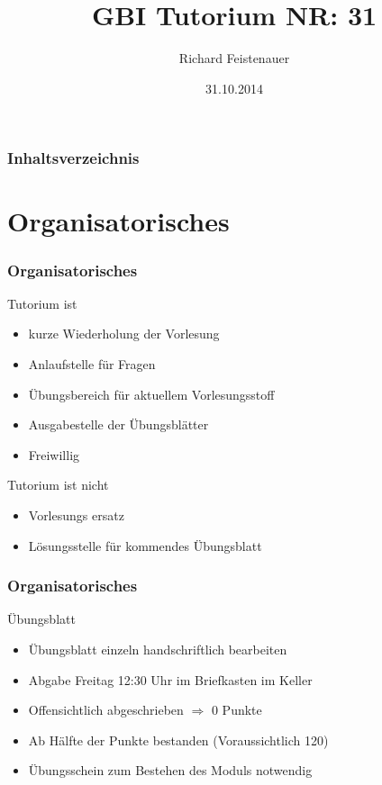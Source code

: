 \documentclass{beamer}
\date{31.10.2014}
\author{ Richard Feistenauer }
\title {GBI Tutorium NR: 31}
\begin{document}
\begin{frame}
	\titlepage
\end{frame}

\begin{frame}
	\frametitle {Inhaltsverzeichnis}
	\tableofcontents
\end{frame}

\section{Organisatorisches}

\begin{frame}
	\frametitle {Organisatorisches}
	\begin{block}{Tutorium ist}
        		\begin{itemize}
			\item kurze Wiederholung der Vorlesung
			\item Anlaufstelle für Fragen
			\item Übungsbereich für aktuellem Vorlesungsstoff
			\item Ausgabestelle der Übungsblätter
			\item Freiwillig
		\end{itemize}
	\end{block}

	\begin{block}{Tutorium ist nicht}
        		\begin{itemize}
			\item Vorlesungs ersatz
			\item Lösungsstelle für kommendes Übungsblatt
		\end{itemize}
	\end{block}
\end{frame}

\begin{frame}
	\frametitle {Organisatorisches}
	\begin{block}{Übungsblatt}
        		\begin{itemize}
			\item Übungsblatt einzeln handschriftlich bearbeiten
			\item Abgabe Freitag 12:30 Uhr im Briefkasten im Keller
			\item Offensichtlich abgeschrieben $\Rightarrow$ 0 Punkte
			\item Ab Hälfte der Punkte bestanden (Voraussichtlich 120)
			\item Übungsschein zum Bestehen des Moduls notwendig
		\end{itemize}
	\end{block}
\end{frame}
\end{document}
